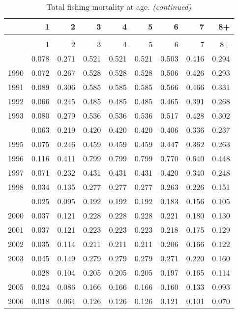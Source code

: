 \documentclass[
]{article}
\begin{document}
\begin{longtable}[t]{lrrrrrrrr}
\caption{\label{tab:FAA-tot-table}Total fishing mortality at age.}\\
\toprule
  & 1 & 2 & 3 & 4 & 5 & 6 & 7 & 8+\\
\midrule
\endfirsthead
\caption[]{Total fishing mortality at age. \textit{(continued)}}\\
\toprule
  & 1 & 2 & 3 & 4 & 5 & 6 & 7 & 8+\\
\midrule
\endhead

\endfoot
\bottomrule
\endlastfoot
1989 & 0.078 & 0.271 & 0.521 & 0.521 & 0.521 & 0.503 & 0.416 & 0.294\\
1990 & 0.072 & 0.267 & 0.528 & 0.528 & 0.528 & 0.506 & 0.426 & 0.293\\
1991 & 0.089 & 0.306 & 0.585 & 0.585 & 0.585 & 0.566 & 0.466 & 0.331\\
1992 & 0.066 & 0.245 & 0.485 & 0.485 & 0.485 & 0.465 & 0.391 & 0.268\\
1993 & 0.080 & 0.279 & 0.536 & 0.536 & 0.536 & 0.517 & 0.428 & 0.302\\
\addlinespace
1994 & 0.063 & 0.219 & 0.420 & 0.420 & 0.420 & 0.406 & 0.336 & 0.237\\
1995 & 0.075 & 0.246 & 0.459 & 0.459 & 0.459 & 0.447 & 0.362 & 0.263\\
1996 & 0.116 & 0.411 & 0.799 & 0.799 & 0.799 & 0.770 & 0.640 & 0.448\\
1997 & 0.071 & 0.232 & 0.431 & 0.431 & 0.431 & 0.420 & 0.340 & 0.248\\
1998 & 0.034 & 0.135 & 0.277 & 0.277 & 0.277 & 0.263 & 0.226 & 0.151\\
\addlinespace
1999 & 0.025 & 0.095 & 0.192 & 0.192 & 0.192 & 0.183 & 0.156 & 0.105\\
2000 & 0.037 & 0.121 & 0.228 & 0.228 & 0.228 & 0.221 & 0.180 & 0.130\\
2001 & 0.037 & 0.121 & 0.223 & 0.223 & 0.223 & 0.218 & 0.175 & 0.129\\
2002 & 0.035 & 0.114 & 0.211 & 0.211 & 0.211 & 0.206 & 0.166 & 0.122\\
2003 & 0.045 & 0.149 & 0.279 & 0.279 & 0.279 & 0.271 & 0.220 & 0.160\\
\addlinespace
2004 & 0.028 & 0.104 & 0.205 & 0.205 & 0.205 & 0.197 & 0.165 & 0.114\\
2005 & 0.024 & 0.086 & 0.166 & 0.166 & 0.166 & 0.160 & 0.133 & 0.093\\
2006 & 0.018 & 0.064 & 0.126 & 0.126 & 0.126 & 0.121 & 0.101 & 0.070\\

\end{longtable}
\end{document}
